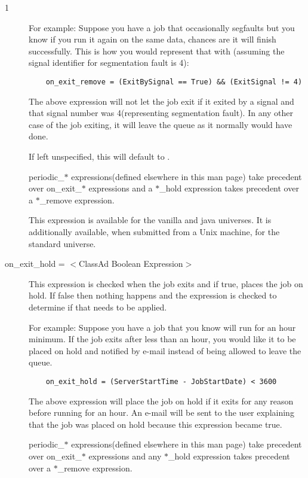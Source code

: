 \begin{ManPage}{\label{man-condor-submit}}{1}
\begin{description}
For example:
Suppose you have a job that occasionally segfaults but you know if you run it
again on the same data, chances are it will finish successfully. This is
how you would represent that with (assuming the
signal identifier for segmentation fault is 4):

\begin{verbatim}
	on_exit_remove = (ExitBySignal == True) && (ExitSignal != 4)
\end{verbatim}

The above expression will not let the job exit if it exited by a signal and
that signal number was 4(representing segmentation fault). In any other case
of the job exiting, it will leave the queue as it normally would have done.

If left unspecified, this will default to .

periodic\_$*$ expressions(defined elsewhere in this man page) take
precedent over on\_exit\_$*$ expressions and a $*$\_hold expression takes
precedent over a $*$\_remove expression.

This expression is available for the vanilla and java universes.
It is additionally available, when submitted from a Unix machine,
for the standard universe.


\item[on\_exit\_hold = $<$ClassAd Boolean Expression$>$] This expression
is checked when the job exits and if true, places the job on hold. If false
then nothing happens and the  expression is
checked to determine if that needs to be applied.

For example:
Suppose you have a job that you know will run for an hour minimum. If
the job exits after less than an hour, you would like it to be placed on
hold and notified by e-mail instead of being allowed to leave the queue.

\begin{verbatim}
	on_exit_hold = (ServerStartTime - JobStartDate) < 3600
\end{verbatim}

The above expression will place the job on hold if it exits for any reason
before running for an hour. An e-mail will be sent to the user explaining
that the job was placed on hold because this expression became true.

periodic\_$*$ expressions(defined elsewhere in this man page) take
precedent over on\_exit\_$*$ expressions and any $*$\_hold expression takes
precedent over a $*$\_remove expression.


\end{description}
\end{ManPage}
